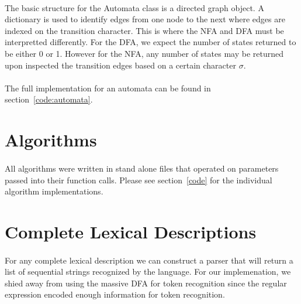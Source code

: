 \documentclass{article}
\begin{document}
\paragraph{} The basic structure for the Automata class is a directed
graph object. A dictionary is used to identify edges from one node to
the next where edges are indexed on the transition character. This is
where the NFA and DFA must be interpretted differently. For the DFA,
we expect the number of states returned to be either 0 or 1. However
for the NFA, any number of states may be returned upon inspected the
transition edges based on a certain character $\sigma$.

\paragraph{} The full implementation for an automata can be found in section~\ref{code:automata}.

\section{Algorithms}
\paragraph{}All algorithms were written in stand alone files that
operated on parameters passed into their function calls. Please see
section~\ref{code} for the individual algorithm implementations.

\section{Complete Lexical Descriptions}
\paragraph{}For any complete lexical description we can construct a 
parser that will return a list of sequential strings recognized by the
language. For our implemenation, we shied away from using the massive
DFA for token recognition since the regular expression encoded enough
information for token recognition. 
\end{document}
